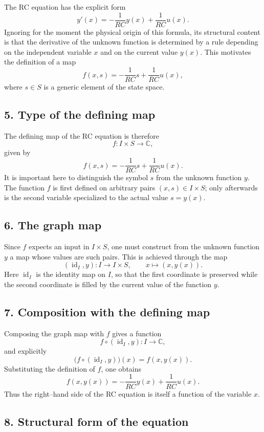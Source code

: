 \documentclass[12pt]{article}
\begin{document}
	The RC equation has the explicit form
	$$
	y'(x)=-\frac{1}{RC}y(x)+\frac{1}{RC}u(x).
	$$
	Ignoring for the moment the physical origin of this formula, its structural content is that the derivative of the unknown function is determined by a rule depending on the independent variable \(x\) and on the current value \(y(x)\). This motivates the definition of a map
	$$
	f(x,s)=-\frac{1}{RC}s+\frac{1}{RC}u(x),
	$$
	where \(s\in S\) is a generic element of the state space.
	
	\subsection*{5. Type of the defining map}
	
	The defining map of the RC equation is therefore
	$$
	f:I\times S\to\mathbb{C},
	$$
	given by
	$$
	f(x,s)= -\frac{1}{RC}s+\frac{1}{RC}u(x).
	$$
	It is important here to distinguish the symbol \(s\) from the unknown function \(y\). The function \(f\) is first defined on arbitrary pairs \((x,s)\in I\times S\); only afterwards is the second variable specialized to the actual value \(s=y(x)\).
	
	\subsection*{6. The graph map}
	
	Since \(f\) expects an input in \(I\times S\), one must construct from the unknown function \(y\) a map whose values are such pairs. This is achieved through the map
	$$
	(\operatorname{id}_I,y):I\to I\times S,
	\qquad
	x\mapsto (x,y(x)).
	$$
	Here \(\operatorname{id}_I\) is the identity map on \(I\), so that the first coordinate is preserved while the second coordinate is filled by the current value of the function \(y\).
	
	\subsection*{7. Composition with the defining map}
	
	Composing the graph map with \(f\) gives a function
	$$
	f\circ(\operatorname{id}_I,y):I\to\mathbb{C},
	$$
	and explicitly
	$$
	\bigl(f\circ(\operatorname{id}_I,y)\bigr)(x)=f(x,y(x)).
	$$
	Substituting the definition of \(f\), one obtains
	$$
	f(x,y(x))= -\frac{1}{RC}y(x)+\frac{1}{RC}u(x).
	$$
	Thus the right--hand side of the RC equation is itself a function of the variable \(x\).
	
	\subsection*{8. Structural form of the equation}
	
\end{document}

